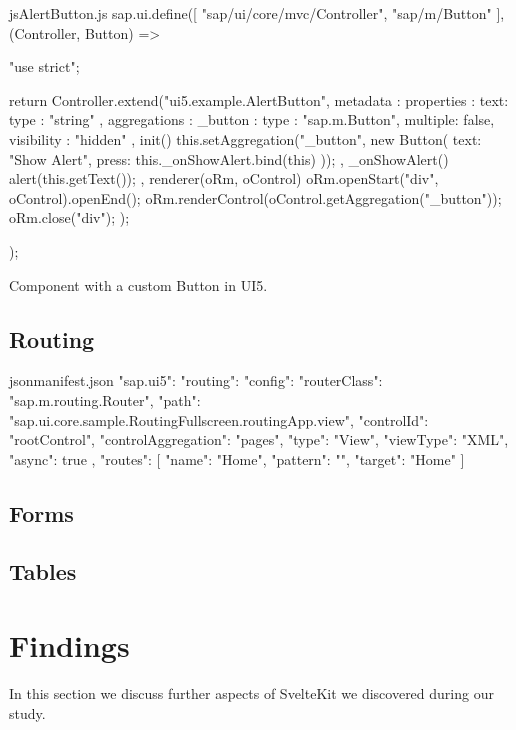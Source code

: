 \begin{listing}[h!]
\begin{myminted}{js}{AlertButton.js}
sap.ui.define([
  "sap/ui/core/mvc/Controller",
  "sap/m/Button"
], (Controller, Button) => {
  "use strict";

  return Controller.extend("ui5.example.AlertButton", {
    metadata : {
      properties : {
        text: {type : "string" }
      },
      aggregations : {
        _button : {
          type : "sap.m.Button", 
          multiple: false, 
          visibility : "hidden"
        }
      }
    },
    init() {
      this.setAggregation("_button", new Button({
        text: "Show Alert",
        press: this._onShowAlert.bind(this)
      }));
    },
    _onShowAlert() {
        alert(this.getText());
    },
    renderer(oRm, oControl) {
      oRm.openStart("div", oControl).openEnd();
      oRm.renderControl(oControl.getAggregation("_button"));
      oRm.close("div");
    }
  });
});
\end{myminted}
\caption{Component with a custom Button in UI5.}
\label{fig:evaluation-component-ui5}
\end{listing}

\subsection{Routing}

\begin{myminted}{json}{manifest.json}
{
  "sap.ui5": {
    "routing": {
      "config": {
        "routerClass": "sap.m.routing.Router",
        "path": "sap.ui.core.sample.RoutingFullscreen.routingApp.view",
        "controlId": "rootControl",
        "controlAggregation": "pages",
        "type": "View",
        "viewType": "XML",
        "async": true
      },
      "routes": [
        {
          "name": "Home",
          "pattern": "",
          "target": "Home"
        }
      ]
    }
  }
}
\end{myminted}

\subsection{Forms}

\subsection{Tables}

\section{Findings}
In this section we discuss further aspects of SvelteKit we discovered during our study. 

